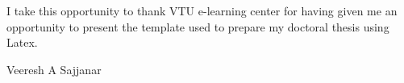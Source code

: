 \begin{acknowledgements}
\normalsize{
I take this opportunity to thank VTU e-learning center for having given me an opportunity to present the template used to prepare my doctoral thesis using Latex.
}
\vspace{1.5cm}

Veeresh A Sajjanar
\end{acknowledgements}


